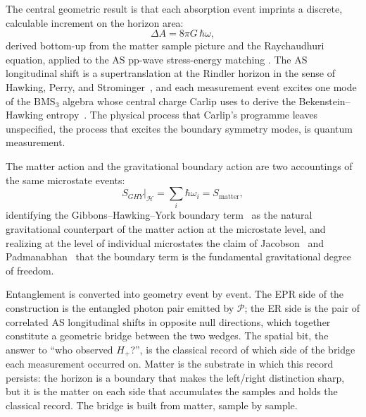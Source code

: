 \documentclass[12pt,a4paper]{article}
\begin{document}
The central geometric result is that each absorption event 
imprints a discrete, calculable increment on the horizon area:
\begin{equation}
\Delta A = 8\pi G\,\hbar\omega,
\end{equation}
derived bottom-up from the matter sample picture and
the Raychaudhuri equation, applied to the AS 
pp-wave stress-energy matching \cite{jacobson1995thermodynamics}. The AS longitudinal shift is a 
supertranslation at the Rindler horizon in the sense of 
Hawking, Perry, and Strominger~\cite{hawking2016soft}, and 
each measurement event excites one mode of the 
$\mathrm{BMS}_3$ algebra whose central charge Carlip 
uses to derive the Bekenstein--Hawking 
entropy~\cite{carlip2018bms}. The physical process that 
Carlip's programme leaves unspecified, the process that 
excites the boundary symmetry modes, is quantum 
measurement.

The matter action and the gravitational boundary action are 
two accountings of the same microstate events:
\begin{equation}
S_{GHY}\big|_{\mathcal{H}} = \sum_i \hbar\omega_i 
= S_{\text{matter}},
\end{equation}
identifying the Gibbons--Hawking--York boundary 
term~\cite{gibbons1977action} as the natural gravitational 
counterpart of the matter action at the microstate level, 
and realizing at the level of individual microstates the 
claim of Jacobson~\cite{jacobson1995thermodynamics} and 
Padmanabhan~\cite{padmanabhan2010thermodynamical} that the 
boundary term is the fundamental gravitational degree of 
freedom.

Entanglement is converted into geometry event by event. The 
EPR side of the construction is the entangled photon pair 
emitted by $\mathcal{P}$; the ER side is the pair of 
correlated AS longitudinal shifts in opposite null 
directions, which together constitute a geometric bridge 
between the two wedges. The spatial bit, the answer to 
``who observed $H_+$?'', is the classical record of which 
side of the bridge each measurement occurred on. Matter is 
the substrate in which this record persists: the horizon is 
a boundary that makes the left/right distinction sharp, but 
it is the matter on each side that accumulates the samples 
and holds the classical record. The bridge is built from 
matter, sample by sample.
\end{document}
